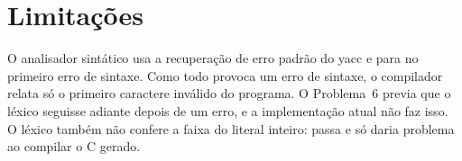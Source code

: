 
\section{Limitações}
\label{sec:limitacoes}

O analisador sintático usa a recuperação de erro padrão do yacc e para no
primeiro erro de sintaxe. Como todo  provoca um erro de sintaxe, o
compilador relata só o primeiro caractere inválido do programa. O Problema~6
previa que o léxico seguisse adiante depois de um erro, e a implementação atual
não faz isso. O léxico também não confere a faixa do literal inteiro:
 passa e só daria problema ao compilar o C gerado.
